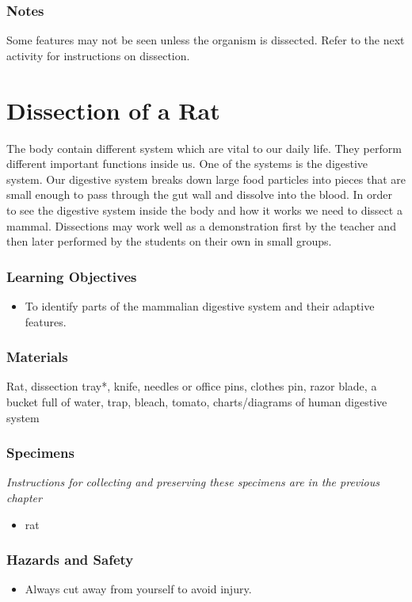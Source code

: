 \subsubsection*{Notes}
Some features may not be seen unless the organism is dissected.  Refer to the next activity for instructions on dissection.


\section{Dissection of a Rat}
The body contain different system which are vital to our daily life. They perform different important functions inside us. One of the systems is the digestive system. Our digestive system breaks down large food particles into pieces that are small enough to pass through the gut wall and dissolve into the blood. In order to see the digestive system inside the body and how it works we need to dissect a mammal.
Dissections may work well as a demonstration first by the teacher and then later performed by the students on their own in small groups.

\subsubsection*{Learning Objectives}
\begin{itemize}
\item{To identify parts of the mammalian digestive system and their adaptive features.}
\end{itemize}

\subsubsection*{Materials}
Rat, dissection tray*, knife, needles or office pins, clothes pin, razor blade, a bucket full of water, trap, bleach, tomato, charts/diagrams of human digestive system

\subsubsection*{Specimens}
\textit{Instructions for collecting and preserving these specimens are in the previous chapter}
\begin{itemize}
\item{rat}
\end{itemize}

\subsubsection*{Hazards and Safety}
\begin{itemize}
\item{Always cut away from yourself to avoid injury.}
\end{itemize}

